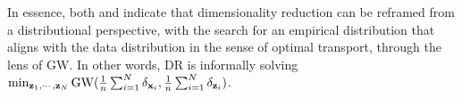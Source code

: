 

In essence, both  and  indicate that dimensionality reduction can be reframed from a distributional perspective, with the search for an empirical distribution that aligns with the data distribution in the sense of optimal transport, through the lens of GW. In other words, DR is informally solving $\min_{{\mathbf{z}}_1, \cdots, {\mathbf{z}}_N} \operatorname{GW}(\frac{1}{n} \sum_{i=1}^{N} \delta_{{\mathbf{x}}_i}, \frac{1}{n} \sum_{i=1}^{N} \delta_{{\mathbf{z}}_i})$.




% 



